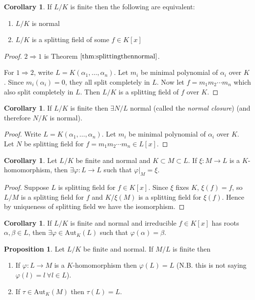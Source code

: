 \documentclass[a4paper]{article}
\newcommand{\Aut}{\text{Aut}}
\theoremstyle{definition}
\newtheorem{prop}[defn]{Proposition}
\newtheorem{coro}[defn]{Corollary}
\begin{document}
\begin{coro}
If $L/K$ is finite then the following are equivalent:
\begin{enumerate}
\item $L/K$ is normal
\item $L/K$ is a splitting field of some $f\in K[x]$
\end{enumerate}
\end{coro}
\begin{proof}
$2\Rightarrow 1$ is Theorem $\ref{thm:splittingthennormal}$.

For $1\Rightarrow 2$, write $L=K(\alpha_1,\ldots,\alpha_n)$. Let $m_i$ be minimal polynomial of $\alpha_i$ over $K$. Since $m_i(\alpha_i)=0$, they all split completely in $L$. Now let $f=m_1m_2\cdots m_n$ which also split completely in $L$. Then $L/K$ is a splitting field of $f$ over $K$.
\end{proof}

\begin{coro}
\label{coro:normalclosure}
If $L/K$ is finite then $\exists N/L$ normal (called the \textit{normal closure}) (and therefore $N/K$ is normal).
\end{coro}
\begin{proof}
Write $L=K(\alpha_1,\ldots,\alpha_n)$. Let $m_i$ be minimal polynomial of $\alpha_i$ over $K$. Let $N$ be splitting field for $f=m_1m_2\cdots m_n\in L[x]$.
\end{proof}

\begin{coro}
\label{coro:finitenormalthenrestriction}
Let $L/K$ be finite and normal and $K\subset M\subset L$. If $\xi:M\rightarrow L$ is a $K$-homomorphism, then $\exists \varphi: L\rightarrow L$ such that $\varphi|_M=\xi$.
\end{coro}
\begin{proof}
Suppose $L$ is splitting field for $f\in K[x]$. Since $\xi$ fixes $K$, $\xi(f)=f$, so $L/M$ is a splitting field for $f$ and $K/\xi(M)$ is a splitting field for $\xi(f)$. Hence by uniqueness of splitting field we have the isomorphism.
\end{proof}

\begin{coro}
\label{coro:FNIthenAutTakesRootToRoot}
If $L/K$ is finite and normal and irreducible $f\in K[x]$ has roots $\alpha,\beta\in L$, then $\exists \varphi\in\Aut_K(L)$ such that $\varphi(\alpha)=\beta$.
\end{coro}

\begin{prop}
\label{prop:autFixNormal}
Let $L/K$ be finite and normal. If $M/L$ is finite then
\begin{enumerate}
\item If $\varphi:L\rightarrow M$ is a $K$-homomorphism then $\varphi(L)=L$ (N.B. this is not saying $\varphi(l)=l \ \forall l\in L$).
\item If $\tau\in\Aut_K(M)$ then $\tau (L)=L$.
\end{enumerate}
\end{prop}
\end{document}
